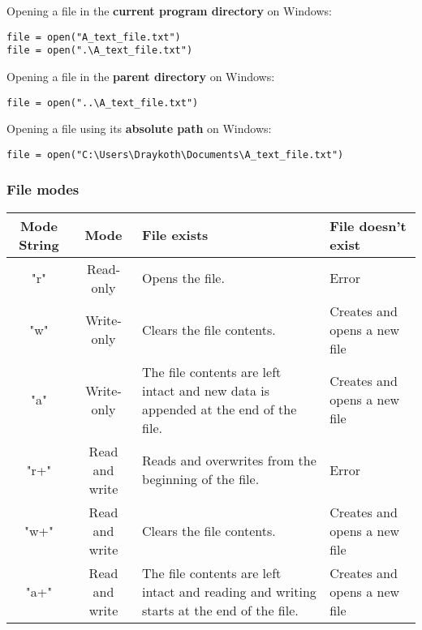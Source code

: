 \documentclass[11pt]{article}
\begin{document}
 \noindent Opening a file in the \textbf{current program directory} on Windows:
\begin{verbatim}
file = open("A_text_file.txt")
file = open(".\A_text_file.txt")
\end{verbatim}

 \noindent Opening a file in the \textbf{parent directory} on Windows:
\begin{verbatim}
file = open("..\A_text_file.txt")
\end{verbatim}

 \noindent Opening a file using its \textbf{absolute path} on Windows:
\begin{verbatim}
file = open("C:\Users\Draykoth\Documents\A_text_file.txt")
\end{verbatim}
\subsubsection{File modes}
\label{sec:org3d09c62}
\begin{center}
\begin{tabular}{|c|c|m{10em}|m{10em}|}
\hline
Mode String & Mode & File exists & File doesn't exist\\
\hline
"r" & Read-only & Opens the file. & Error\\
\hline
"w" & Write-only & Clears the file contents. & Creates and opens a new file\\
\hline
"a" & Write-only & The file contents are left intact and new data is appended at the end of the file. & Creates and opens a new file\\
\hline
"r+" & Read and write & Reads and overwrites from the beginning of the file. & Error\\
\hline
"w+" & Read and write & Clears the file contents. & Creates and opens a new file\\
\hline
"a+" & Read and write & The file contents are left intact and reading and writing starts at the end of the file. & Creates and opens a new file\\
\hline
\end{tabular}
\end{center}
\end{document}
